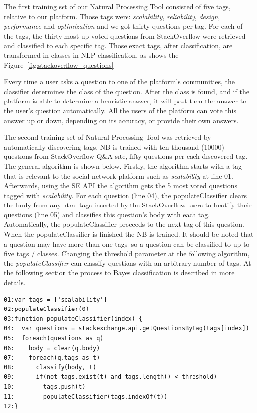 The first training set of our Natural Processing Tool consisted of five tags, relative to our platform. Those tags were: \emph{scalability}, \emph{reliability}, \emph{design}, \emph{performance} and \emph{optimization} and we got thirty questions per tag. For each of the tags, the thirty most up-voted questions from StackOverflow were retrieved and classified to each specific tag. Those exact tags, after classification, are transformed in classes in NLP classification, as shows the Figure~\ref{fig:stackoverflow_questions}

Every time a user asks a question to one of the platform's communities, the classifier determines the class of the question. After the class is found, and if the platform is able to determine a heuristic answer, it will post then the answer to the user's question automatically. All the users of the platform can vote this answer up or down, depending on its accuracy, or provide their own answers.

The second training set of Natural Processing Tool was retrieved by automatically discovering tags. NB is trained with ten thousand (10000) questions from StackOverflow Q\&A site, fifty questions per each discovered tag. The general algorithm is shown below. Firstly, the algorithm starts with a tag that is relevant to the social network platform such as \emph{scalability} at line 01. Afterwards, using the SE API the algorithm gets the 5 most voted questions tagged with \emph{scalability}. For each question (line 04), the populateClassifier clears the body from any html tags inserted by the StackOverflow users to beatify their questions (line 05) and classifies this question's body with each tag. Automatically, the populateClassifier proceeds to the next tag of this question. When the populateClassifier is finished the NB is trained. It should be noted that a question may have more than one tags, so a question can be classified to up to five tags / classes. Changing the threshold parameter at the following algorithm, the \emph{populateClassifier} can classify questions with an arbitrary number of tags. At the following section the process to Bayes classification is described in more details.

\begin{lstlisting} 
01:var tags = ['scalability']
02:populateClassifier(0)
03:function populateClassifier(index) {
04:  var questions = stackexchange.api.getQuestionsByTag(tags[index])
05:  foreach(questions as q)
06:    body = clear(q.body)
07:    foreach(q.tags as t)
08:    	 classify(body, t)
09:    	 if(not tags.exist(t) and tags.length() < threshold)
10:    	   tags.push(t)	  
11:        populateClassifier(tags.indexOf(t))
12:}		
\end{lstlisting}

